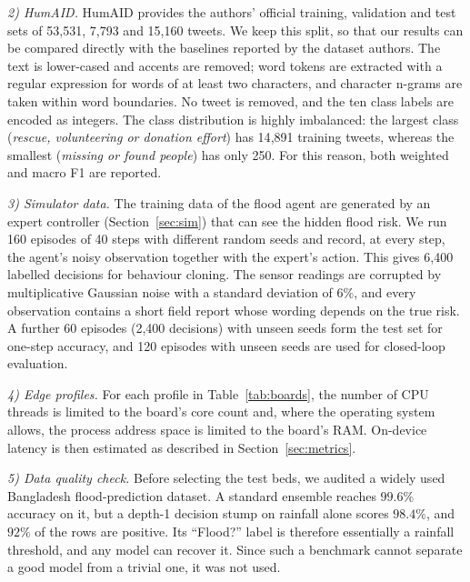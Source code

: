 \documentclass[journal]{IEEEtran}
\begin{document}
\textit{2) HumAID.} HumAID provides the authors' official training, validation
and test sets of 53{,}531, 7{,}793 and 15{,}160 tweets. We keep this split, so
that our results can be compared directly with the baselines reported by the
dataset authors. The text is lower-cased and accents are removed; word tokens
are extracted with a regular expression for words of at least two characters,
and character n-grams are taken within word boundaries. No tweet is removed,
and the ten class labels are encoded as integers. The class distribution is
highly imbalanced: the largest class (\emph{rescue, volunteering or donation
effort}) has 14{,}891 training tweets, whereas the smallest (\emph{missing or
found people}) has only 250. For this reason, both weighted and macro F1 are
reported.

\textit{3) Simulator data.} The training data of the flood agent are generated
by an expert controller (Section~\ref{sec:sim}) that can see the hidden flood
risk. We run 160 episodes of 40 steps with different random seeds and record,
at every step, the agent's noisy observation together with the expert's
action. This gives 6{,}400 labelled decisions for behaviour cloning. The
sensor readings are corrupted by multiplicative Gaussian noise with a standard
deviation of $6\%$, and every observation contains a short field report whose
wording depends on the true risk. A further 60 episodes (2{,}400 decisions)
with unseen seeds form the test set for one-step accuracy, and 120 episodes
with unseen seeds are used for closed-loop evaluation.

\textit{4) Edge profiles.} For each profile in Table~\ref{tab:boards}, the
number of CPU threads is limited to the board's core count and, where the
operating system allows, the process address space is limited to the board's
RAM. On-device latency is then estimated as described in
Section~\ref{sec:metrics}.

\textit{5) Data quality check.} Before selecting the test beds, we audited a
widely used Bangladesh flood-prediction dataset. A standard ensemble reaches
$99.6\%$ accuracy on it, but a depth-1 decision stump on rainfall alone scores
$98.4\%$, and $92\%$ of the rows are positive. Its ``Flood?'' label is therefore
essentially a rainfall threshold, and any model can recover it. Since such a
benchmark cannot separate a good model from a trivial one, it was not used.
\end{document}
